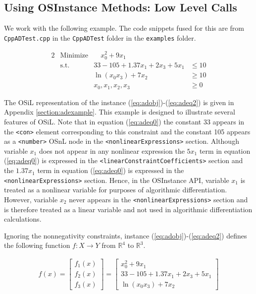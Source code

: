\documentclass[11pt]{article}
\renewcommand{\_}{{\char"5F}}
\renewcommand{\{}{{\char"7B}}
\renewcommand{\}}{{\char"7D}}
\renewcommand{\^}{{\char"0D}}
\renewcommand{\'}{{\char"0D}}
\begin{document}
 

\subsection{Using OSInstance Methods: Low Level Calls}

We work with the  following example.  The code snippets fused for this are from {\tt CppADTest.cpp} in the {\tt CppADTest} folder in the {\tt examples} folder.

\begin{alignat}{2}
& \mbox{Minimize} & \quad  x_{0}^{2} + 9x_{1} \label{eq:adobj}\\
& \mbox{s.t.} & 33 - 105 + 1.37 x_{1} + 2x_{3} + 5 x_{1} &\le 10  \label{eq:adeq0}\\
& & \ln(x_{0} x_{3}) + 7x_{2} &\ge 10 \label{eq:adeq1} \\
& & x_{0}, x_{1}, x_{2}, x_{3} &\ge 0 \label{eq:adeq2}
\end{alignat}

The OSiL representation of the instance  (\ref{eq:adobj})-(\ref{eq:adeq2}) is given in Appendix \ref{section:adexample}.  This example is designed to illustrate several features of OSiL. Note that in equation (\ref{eq:adeq0}) the constant 33 appears in the {\tt <con>} element corresponding to this constraint and the constant 105 appears as a {\tt <number>} OSnL node in the {\tt <nonlinearExpressions>} section. Although variable $x_{1}$ does not appear in any nonlinear expression the $5 x_{1}$ term in equation (\ref{eq:adeq0}) is expressed in the {\tt <linearConstraintCoefficients>} section and the $1.37 x_{1}$ term in equation (\ref{eq:adeq0}) is expressed in the {\tt <nonlinearExpressions>} section.  Hence, in the OSInstance API, variable $x_{1}$ is treated as a nonlinear variable for purposes of algorithmic differentiation. However, variable $x_{2}$ never appears in the  {\tt <nonlinearExpressions>} section and is therefore treated as a linear variable and not used  in algorithmic differentiation calculations. 

Ignoring the nonnegativity constraints, instance (\ref{eq:adobj})-(\ref{eq:adeq2})  defines the following function $f:X \rightarrow Y$ from $ \mathbb{R}^{4}$ to $ \mathbb{R}^{3}.$

\begin{eqnarray}
f(x) =
\left[
\begin{array}{r}
f_{1}(x) \\
f_{2}(x) \\
f_{3}(x)
\end{array}
\right]
=
\left[
\begin{array}{r}
x_{0}^{2} + 9x_{1}  \\
33 - 105 + 1.37 x_{1} + 2x_{3} + 5 x_{1} \\
\ln(x_{0} x_{3}) + 7x_{2}
\end{array}
\right] \label{eq:definef}
\end{eqnarray}
\end{document}
